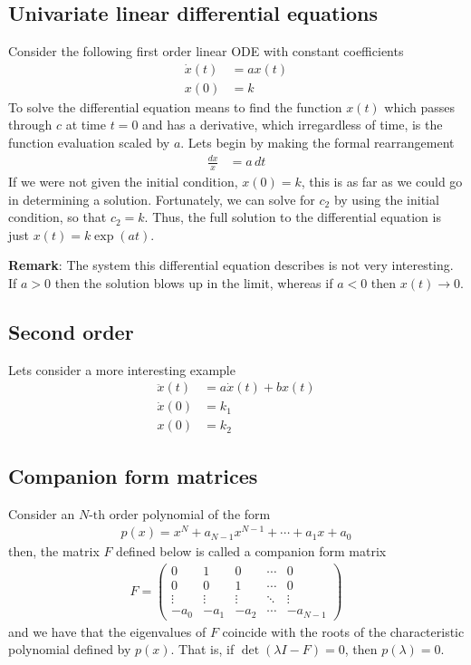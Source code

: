 \documentclass[a4paper,11pt]{exam}
\newcounter{ct}
\begin{document}
\begin{questions}
\subsection{Univariate linear differential equations}
Consider the following first order linear ODE with constant coefficients
\begin{align}
    \dot{x}(t) &= a x(t)\\
    x(0) &= k
\end{align}
To solve the differential equation means to find the function $x(t)$ which passes through $c$ at time $t=0$ and has a derivative, which irregardless of time, is the function evaluation scaled by $a$.  Lets begin by making the formal rearrangement
\begin{align}
    \frac{dx}{x} &= a \, dt
\end{align}
If we were not given the initial condition, $x(0)=k$, this is as far as we could go in determining a solution.  Fortunately, we can solve for $c_2$ by using the initial condition, so that $c_2 = k$.  Thus, the full solution to the differential equation is just $x(t) = k \exp(at)$.  

\textbf{Remark}: The system this differential equation describes is not very interesting.  If $a > 0$ then the solution blows up in the limit, whereas if $a < 0$ then $x(t) \rightarrow 0$.

\subsection{Second order}
Lets consider a more interesting example
\begin{align}
    \ddot{x}(t) &= a\dot{x}(t) + b x(t)\\
    \dot{x}(0) &= k_1\\
    x(0) &= k_2
\end{align}

\subsection{Companion form matrices}
Consider an $N\text{-th}$ order polynomial of the form
\begin{align}
    p(x) = x^N + a_{N-1} x^{N-1} + \cdots + a_1 x + a_0
\end{align}
then, the matrix $F$ defined below is called a companion form matrix
\begin{align}
    F = \begin{pmatrix} 0 & 1 & 0 & \cdots & 0\\
                        0 & 0 & 1 & \cdots & 0\\
                        \vdots & \vdots & \vdots & \ddots & \vdots\\
                        -a_0 & -a_1 & -a_2 & \cdots & -a_{N-1}\end{pmatrix}
\end{align}
and we have that the eigenvalues of $F$ coincide with the roots of the characteristic polynomial defined by $p(x)$.  That is, if $\det(\lambda I - F) = 0$, then $p(\lambda) = 0$.  

\end{questions}
\end{document}
